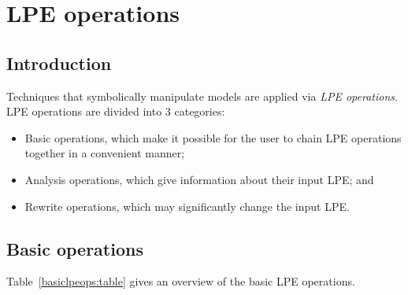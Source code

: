 \chapter{LPE operations} \label{lpeoperations}

\section{Introduction}

Techniques that symbolically manipulate \txs{} models are applied via \emph{LPE operations}.
LPE operations are divided into 3 categories:

\begin{itemize}
\item Basic operations, which make it possible for the user to chain LPE operations together in a convenient manner;
\item Analysis operations, which give information about their input LPE; and
\item Rewrite operations, which may significantly change the input LPE.
\end{itemize}

\section{Basic operations}

Table~\ref{basiclpeops:table} gives an overview of the basic LPE operations.

